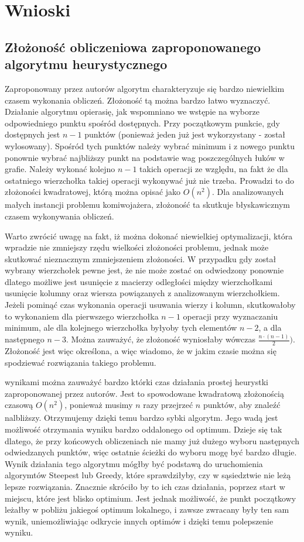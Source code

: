\section{Wnioski}

\subsection{Złożoność obliczeniowa zaproponowanego algorytmu heurystycznego}

Zaproponowany przez autorów algorytm charakteryzuje się bardzo niewielkim
czasem wykonania obliczeń. Złożoność tą można bardzo łatwo wyznaczyć.
Działanie algorytmu opierasię, jak wspomniano we wstępie na wyborze
odpowiedniego punktu spośród dostępnych. Przy początkowym punkcie, gdy
dostępnych jest $n - 1$ punktów (ponieważ jeden już jest wykorzystany - 
został wylosowany). Spośród tych punktów należy wybrać minimum i
z nowego punktu ponownie wybrać najbliższy punkt na podstawie wag
poszczególnych łuków w grafie. Należy wykonać kolejno $n - 1$
takich operacji ze względu, na fakt że dla ostatniego 
wierzchołka takiej operacji wykonywać już nie trzeba. Prowadzi to do
złożoności kwadratowej, którą można opisać jako $ O(n^{2}) $.
Dla analizowanych małych instancji problemu komiwojażera, złożoność ta
skutkuje błyskawicznym czasem wykonywania obliczeń.

Warto zwrócić uwagę na fakt, iż można dokonać niewielkiej optymalizacji,
która wpradzie nie zmniejszy rzędu wielkości złożoności problemu, jednak
może skutkować nieznacznym zmniejszeniem złożoności. W przypadku gdy został
wybrany wierzchołek pewne jest, że nie może zostać on odwiedzony ponownie
dlatego możliwe jest usunięcie z macierzy odległości między
wierzchołkami usunięcie kolumny oraz wiersza powiązanych z
analizowanym wierzchołkiem. Jeżeli pominąć czas wykonania
operacji usuwania wierzy i kolumn, skutkowałoby to wykonaniem dla pierwszego
wierzchołka $n - 1$ operacji przy wyznaczaniu minimum, ale dla kolejnego
wierzchołka byłyoby tych elementów $n - 2$, a dla następnego $n - 3$.
Można zauważyć, że złożoność wyniosłaby wówczas $\frac{n \cdot (n - 1)}{2})$.
Złożoność jest więc określona, a więc wiadomo, że w jakim czasie
można się spodziewać rozwiązania takiego problemu.


wynikami można zauważyć bardzo którki czas działania prostej
heurystki zaproponowanej przez autorów. Jest to spowodowane kwadratową złożonością 
czasową $ O(n^{2}) $, ponieważ musimy $ n $ razy przejrzeć $ n $ punktów, aby znaleźć
nalbliższy. Otrzymujemy dzięki temu bardzo sybki algorytm. Jego wadą jest 
możliwość otrzymania wyniku bardzo oddalonego od optimum. Dzieje się tak dlatego, 
że przy końcowych obliczeniach nie mamy już dużego wyboru następnych odwiedzanych 
punktów, więc ostatnie ścieżki do wyboru mogę być bardzo długie. Wynik działania 
tego algorytmu mógłby być podstawą do uruchomienia algorymtów Steepest lub Greedy, 
które sprawdziłyby, czy w sąsiedztwie nie leżą lepsze rozwiązania. Znacznie skróciło
by to ich czas działania, poprzez start w miejscu, które jest blisko optimium.
Jest jednak możliwość, że punkt początkowy leżałby w pobliżu jakiegoś optimum 
lokalnego, i zawsze zwracany były ten sam wynik, uniemożliwiając odkrycie innych 
optimów i dzięki temu polepszenie wyniku.

